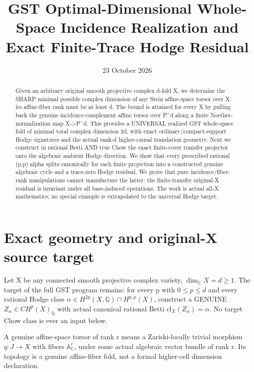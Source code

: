 \documentclass[11pt]{article}
\title{GST Optimal-Dimensional Whole-Space Incidence Realization and Exact Finite-Trace Hodge Residual}
\date{23 October 2026}
\begin{document}
\maketitle
\begin{abstract}
Given an arbitrary original smooth projective complex d-fold X,
we determine the SHARP minimal possible complex dimension
of any Stein affine-space torsor over X: its affine-fiber rank
must be at least d. The bound is attained for every X by
pulling back the genuine incidence-complement affine torsor
over P^d along a finite Noether-normalization map X->P^d.
This provides a UNIVERSAL realized GST whole-space
fold of minimal total complex dimension 2d, with exact
ordinary/compact-support Hodge signatures and the actual
rank-d higher-causal translation geometry.
Next we construct in rational Betti AND true Chow
the exact finite-cover transfer projector onto the
algebraic ambient Hodge direction. We show that every
prescribed rational (p,p) alpha splits canonically for
each finite projection into a constructed genuine algebraic
cycle and a trace-zero Hodge residual. We prove that
pure incidence/fiber-rank manipulations cannot manufacture
the latter: the finite-transfer original-X residual
is invariant under all base-induced operations.
The work is actual all-X mathematics; no special
example is extrapolated to the universal Hodge target.
\end{abstract}

\section{Exact geometry and original-X source target}
Let X be any connected smooth projective complex
variety, $\dim_\mathbb C X=d\ge1$.
The target of the full GST program remains:
for every p with $0\le p\le d$ and every rational
Hodge class $\alpha\in H^{2p}(X,\mathbb Q)\cap H^{p,p}(X)$,
construct a GENUINE
$Z_\alpha\in CH^p(X)_\mathbb Q$
with actual canonical rational Betti
$\mathrm{cl}_X(Z_\alpha)=\alpha$.
No target Chow class is ever an input below.

A genuine affine-space torsor of rank r
means a Zariski-locally trivial morphism
$q:J\to X$ with fibers $\mathbb A^r_\mathbb C$,
under some actual algebraic vector bundle
of rank r. Its topology is a genuine
affine-fiber fold, not a formal
higher-cell dimension declaration.
\end{document}
